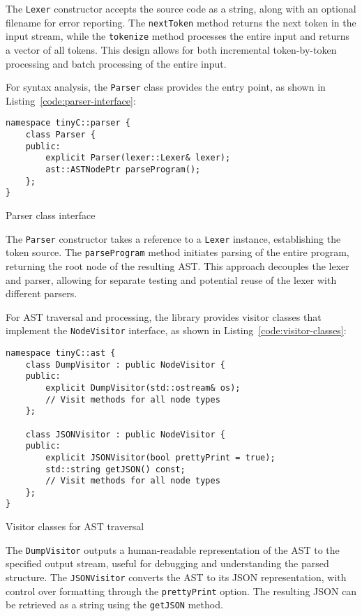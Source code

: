 The \texttt{Lexer} constructor accepts the source code as a string, along with an optional filename for error reporting. The \texttt{nextToken} method returns the next token in the input stream, while the \texttt{tokenize} method processes the entire input and returns a vector of all tokens. This design allows for both incremental token-by-token processing and batch processing of the entire input.

For syntax analysis, the \texttt{Parser} class provides the entry point, as shown in Listing~\ref{code:parser-interface}:

\begin{listing}[ht!]
\begin{verbatim}
namespace tinyC::parser {
    class Parser {
    public:
        explicit Parser(lexer::Lexer& lexer);
        ast::ASTNodePtr parseProgram();
    };
}
\end{verbatim}
\caption{Parser class interface}
\label{code:parser-interface}
\end{listing}

The \texttt{Parser} constructor takes a reference to a \texttt{Lexer} instance, establishing the token source. The \texttt{parseProgram} method initiates parsing of the entire program, returning the root node of the resulting AST. This approach decouples the lexer and parser, allowing for separate testing and potential reuse of the lexer with different parsers.

For AST traversal and processing, the library provides visitor classes that implement the \texttt{NodeVisitor} interface, as shown in Listing~\ref{code:visitor-classes}:

\begin{listing}[ht!]
\begin{verbatim}
namespace tinyC::ast {
    class DumpVisitor : public NodeVisitor {
    public:
        explicit DumpVisitor(std::ostream& os);
        // Visit methods for all node types
    };
    
    class JSONVisitor : public NodeVisitor {
    public:
        explicit JSONVisitor(bool prettyPrint = true);
        std::string getJSON() const;
        // Visit methods for all node types
    };
}
\end{verbatim}
\caption{Visitor classes for AST traversal}
\label{code:visitor-classes}
\end{listing}

The \texttt{DumpVisitor} outputs a human-readable representation of the AST to the specified output stream, useful for debugging and understanding the parsed structure. The \texttt{JSONVisitor} converts the AST to its JSON representation, with control over formatting through the \texttt{prettyPrint} option. The resulting JSON can be retrieved as a string using the \texttt{getJSON} method.

